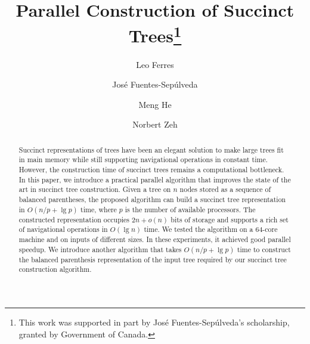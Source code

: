\documentclass[runningheads]{llncs}
\begin{document}
\title{Parallel Construction of Succinct Trees\thanks{This work was supported in part by Jos\'e Fuentes-Sepúlveda's scholarship, granted by Government of Canada.}}

\author{Leo Ferres \and Jos\'e Fuentes-Sep\'ulveda \and Meng He \and Norbert Zeh}

%
%
  

\maketitle              %

\begin{abstract}
Succinct representations of trees have been an elegant solution to make large trees fit in main memory while still supporting
navigational operations in constant time. However, the construction time of succinct trees remains a computational bottleneck. In this
paper, we introduce a practical parallel algorithm that improves the state of the art in succinct tree construction. Given a tree on
$n$ nodes stored as a sequence of balanced parentheses, the proposed algorithm can build a succinct tree representation in
$O(n/p+\lg p)$ time, where $p$ is the number of available processors. The constructed representation occupies $2n + o(n)$
bits of storage and supports a rich set of navigational operations in $O(\lg n)$ time. We tested the algorithm on a $64$-core
machine and on inputs of different sizes.
In these experiments, it achieved good parallel speedup.
We introduce another algorithm that takes $O(n/p + \lg p)$ time to construct
the balanced parenthesis representation of the input tree required by our
succinct tree construction algorithm.
\end{abstract}
%

\end{document}
